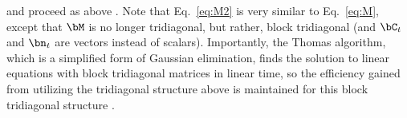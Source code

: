 \noindent and proceed as above%
.  Note that Eq.~\eqref{eq:M2} is very similar to Eq.~\eqref{eq:M}, except that $\bM$ is no longer tridiagonal, but rather, block tridiagonal (and $\bC_t$ and $\bn_t$ are vectors instead of scalars).  Importantly, the Thomas algorithm, which is a simplified form of Gaussian elimination, finds the solution to linear equations with block tridiagonal matrices in linear time, so the efficiency gained from utilizing the tridiagonal structure above is maintained for this block tridiagonal structure \cite{Press92}.   

